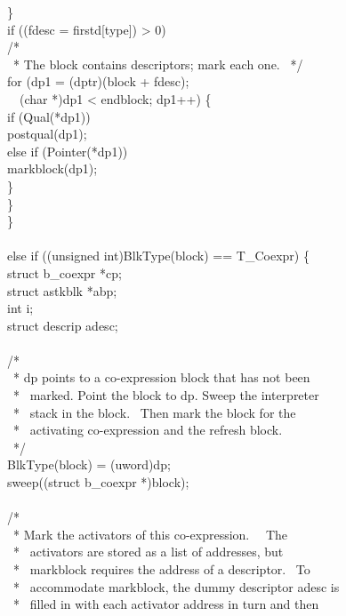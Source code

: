 {\>\>\>\>\}\\
\>\>\>if ((fdesc = firstd[type]) > 0)\\
\>\>\>\>/*\\
\>\>\>\>\ * The block contains descriptors; mark each one. 
\>\>\>\>\ */\\
\>\>\>\>for (dp1 = (dptr)(block + fdesc);\\
\>\>\>\>\>\ \ (char *)dp1 < endblock; dp1++) \{\\
\>\>\>\>\>if (Qual(*dp1))\\
\>\>\>\>\>\>postqual(dp1);\\
\>\>\>\>\>else if (Pointer(*dp1))\\
\>\>\>\>\>\>markblock(dp1);\\
\>\>\>\>\>\}\\
\>\>\>\}\\
\>\>\}\\
\\
\>else if ((unsigned int)BlkType(block) == T\_Coexpr) \{\\
\>\>struct b\_coexpr *cp;\\
\>\>struct astkblk *abp;\\
\>\>int i;\\
\>\>struct descrip adesc;\\
\\
\>\>/*\\
\>\>\ * dp points to a co-expression block that has not been\\
\>\>\ * \ marked. Point the block to dp. Sweep the interpreter\\
\>\>\ * \ stack in the block. \ Then mark the block for the\\
\>\>\ * \ activating co-expression and the refresh block.\\
\>\>\ */\\
\>\>BlkType(block) = (uword)dp;\\
\>\>sweep((struct b\_coexpr *)block);\\
\\
\>\>/*\\
\>\>\ * Mark the activators of this co-expression. \ \ The\\
\>\>\ * \ activators are stored as a list of addresses, but\\
\>\>\ * \ markblock requires the address of a descriptor. \ To\\
\>\>\ * \ accommodate markblock, the dummy descriptor adesc is\\
\>\>\ * \ filled in with each activator address in turn and then\\
}
